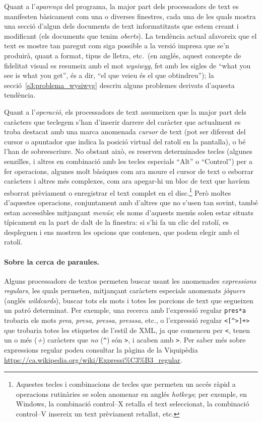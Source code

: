 Quant a l'\emph{aparença} del programa, la major part dels
processadors de text es manifesten bàsicament com una o diverses
finestres, cada una de les quals mostra una secció d'algun dels
documents de text informatitzats que estem creant i modificant (els
documents que tenim \emph{oberts}).  La tendència actual afavoreix que
el text es mostre tan paregut com siga possible a la versió impresa
que se'n produirà, quant a format, tipus de lletra, etc.\ (en anglés,
aquest concepte de fidelitat visual es resumeix amb el mot {\em
  wysiwyg}, fet amb les sigles de ``what you see is what you get'', és
a dir, ``el que veieu és el que obtindreu''); la
secció~\ref{s3:problema_wysiwyg} descriu alguns problemes derivats
d'aquesta tendència.

Quant a l'\emph{operació}, els processadors de text assumeixen que la
major part dels caràcters que teclegem s'han d'inserir darrere del
caràcter que actualment es troba destacat amb una marca anomenada {\em
  cursor} de text (pot ser diferent del cursor o apuntador que indica
la posició virtual del ratolí en la pantalla), o bé l'han de
sobreescriure. No obstant això, es reserven determinades tecles
(algunes senzilles, i altres en combinació amb les tecles especials
``Alt'' o ``Control'') per a fer operacions, algunes molt bàsiques com
ara moure el cursor de text o esborrar caràcters i altres més
complexes, com ara apegar-hi un bloc de text que havíem esborrat
prèviament o enregistrar el text complet en el disc.\footnote{Aquestes
  tecles i combinacions de tecles que permeten un accés ràpid a
  operacions rutinàries se solen anomenar en anglés \emph{hotkeys};
  per exemple, en Windows, la combinació control--X retalla el text
  seleccionat, la combinació control--V insereix un text prèviament
  retallat, etc.} Però moltes d'aquestes operacions, conjuntament amb
d'altres que no s'usen tan sovint, també estan accessibles mitjançant
\emph{menús}; els noms d'aquests menús solen estar situats típicament
en la part de dalt de la finestra: si s'hi fa un clic del ratolí, es
despleguen i ens mostren les opcions que contenen, que podem elegir
amb el ratolí.

\paragraph{Sobre la cerca de paraules.}
Alguns processadors de textos permeten buscar usant les anomenades
\emph{expressions regulars}, les quals permeten, mitjançant caràcters
especials anomenats \emph{jòquers} (anglés \emph{wildcards}), buscar
tots els mots i totes les porcions de text que segueixen un patró
determinat. Per exemple, una recerca amb l'expressió regular
\texttt{pres*a} trobaria els mots \emph{prea}, \emph{presa},
\emph{pressa}, \emph{presssa}, etc., o l'expressió regular
\texttt{<[\^{}>]+>} que trobaria totes les etiquetes de l'estil de
XML, ja que comencen per \texttt{<}, tenen un o més (\emph{+})
caràcters que \emph{no} (\texttt{\^}) són \texttt{>}, i acaben amb
\texttt{>}. Per saber més sobre expressions regular podeu consultar la
pàgina de la Viquipèdia
\url{https://ca.wikipedia.org/wiki/Expressi%C3%B3_regular}.

